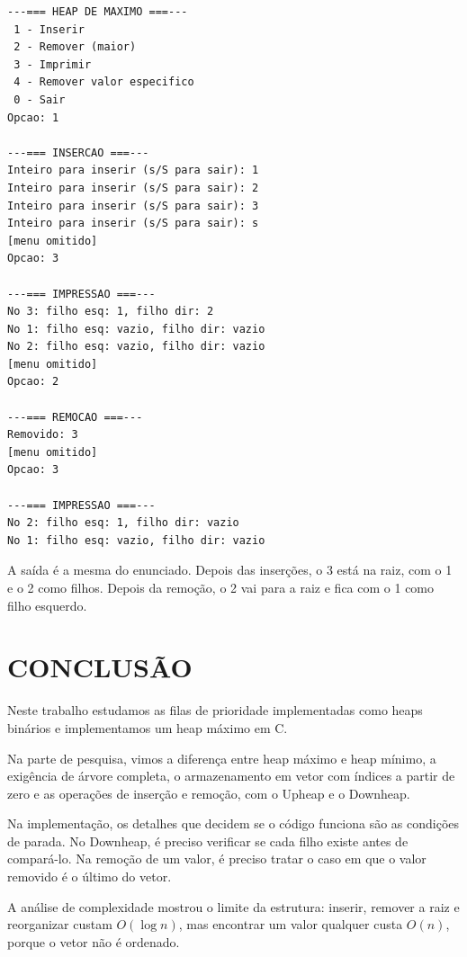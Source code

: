 \documentclass[12pt,openany,oneside,a4paper,english,brazil,sumario=tradicional]{abntex2}
\begin{document}
\begin{quadro}[htbp]
\caption{\label{qua:execucao}Exemplo de execução do programa}
\begin{Verbatim}[fontsize=\footnotesize]
---=== HEAP DE MAXIMO ===---
 1 - Inserir
 2 - Remover (maior)
 3 - Imprimir
 4 - Remover valor especifico
 0 - Sair
Opcao: 1

---=== INSERCAO ===---
Inteiro para inserir (s/S para sair): 1
Inteiro para inserir (s/S para sair): 2
Inteiro para inserir (s/S para sair): 3
Inteiro para inserir (s/S para sair): s
[menu omitido]
Opcao: 3

---=== IMPRESSAO ===---
No 3: filho esq: 1, filho dir: 2
No 1: filho esq: vazio, filho dir: vazio
No 2: filho esq: vazio, filho dir: vazio
[menu omitido]
Opcao: 2

---=== REMOCAO ===---
Removido: 3
[menu omitido]
Opcao: 3

---=== IMPRESSAO ===---
No 2: filho esq: 1, filho dir: vazio
No 1: filho esq: vazio, filho dir: vazio
\end{Verbatim}
\end{quadro}

A saída é a mesma do enunciado. Depois das inserções, o 3 está na raiz, com o 1 e o 2 como filhos. Depois da remoção, o 2 vai para a raiz e fica com o 1 como filho esquerdo.

\chapter{CONCLUSÃO}

Neste trabalho estudamos as filas de prioridade implementadas como heaps binários e implementamos um heap máximo em C.

Na parte de pesquisa, vimos a diferença entre heap máximo e heap mínimo, a exigência de árvore completa, o armazenamento em vetor com índices a partir de zero e as operações de inserção e remoção, com o Upheap e o Downheap.

Na implementação, os detalhes que decidem se o código funciona são as condições de parada. No Downheap, é preciso verificar se cada filho existe antes de compará-lo. Na remoção de um valor, é preciso tratar o caso em que o valor removido é o último do vetor.

A análise de complexidade mostrou o limite da estrutura: inserir, remover a raiz e reorganizar custam $O(\log n)$, mas encontrar um valor qualquer custa $O(n)$, porque o vetor não é ordenado.
\end{document}
